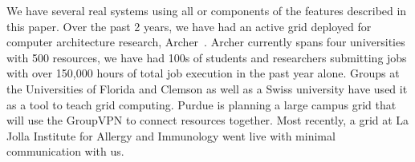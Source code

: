 \documentclass{sig-alternate}
\begin{document}
We have several real systems using all or components of the features described
in this paper.  Over the past 2 years, we have had an active grid deployed for
computer architecture research, Archer~\cite{archer}.  Archer currently spans
four universities with 500 resources, we have had 100s of students and
researchers submitting jobs with over 150,000 hours of total job execution in
the past year alone.  Groups at the Universities of Florida and Clemson as well
as a Swiss university have used it as a tool to teach grid computing.  Purdue
is planning a large campus grid that will use the GroupVPN to connect resources
together.  Most recently, a grid at La Jolla Institute for Allergy and
Immunology went live with minimal communication with us.


\small{

\suppressfloats
}
\end{document}
